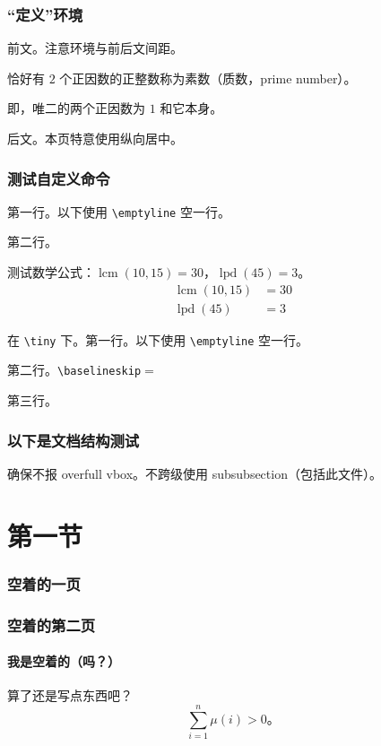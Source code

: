 \documentclass{../pkslide}
\newcommand{\lcm}{\operatorname{lcm}} %
\newcommand{\lpd}{\operatorname{lpd}} %
\begin{document}
\begin{frame}[c]
  \frametitle{“定义”环境}
  前文。注意环境与前后文间距。
  
  \begin{definition}[素数]
    恰好有 $2$ 个正因数的正整数称为{素数（质数，prime number）}。
    
    即，唯二的两个正因数为 $1$ 和它本身。
  \end{definition}
  
  后文。本页特意使用纵向居中。
\end{frame}

\begin{frame}[fragile]
  \frametitle{测试自定义命令}
  第一行。以下使用 \verb|\emptyline| 空一行。
  
  \emptyline
  
  第二行。
  
  测试数学公式：$\lcm(10, 15) = 30$，$\lpd(45) = 3$。
  \begin{align*}
    \lcm(10, 15) &= 30 \\
    \lpd(45) &= 3
  \end{align*}
  {\tiny
    在 \verb|\tiny| 下。第一行。以下使用 \verb|\emptyline| 空一行。
    
    \emptyline
    
    第二行。\verb|\baselineskip|${}={}$\the\baselineskip
    
    \vspace{0.6\baselineskip}
    
    第三行。
    
  } %
\end{frame}

\begin{frame}[c]
  \frametitle{以下是文档结构测试}
  确保不报 overfull vbox。不跨级使用 subsubsection（包括此文件）。
  
  \begin{multicols}{2}
    \tableofcontents
  \end{multicols}
\end{frame}

\section{第一节}

\begin{frame}
  \frametitle{空着的一页}
\end{frame}

\begin{frame}
  \frametitle{空着的第二页}
  \framesubtitle{我是空着的（吗？）}
  算了还是写点东西吧？
  \[ \sum_{i = 1}^{n} \mu(i) > 0 \text{。} \]
\end{frame}
\end{document}
